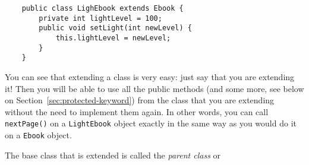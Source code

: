 \begin{verbatim}
    public class LighEbook extends Ebook {
        private int lightLevel = 100;
        public void setLight(int newLevel) {
            this.lightLevel = newLevel;
        }
    }
\end{verbatim}

You can see that extending a class is very easy: just say that you are
extending it! Then you will be able to use all the public methods (and
some more, see below on Section~\ref{sec:protected-keyword}) from
the class that you are extending without the need to implement them
again. In other words, you can call \verb+nextPage()+ on a
\verb+LightEbook+ object exactly in the same way as you would do it
on a \verb+Ebook+ object. 

The base class that is extended is called the \emph{parent class} or
